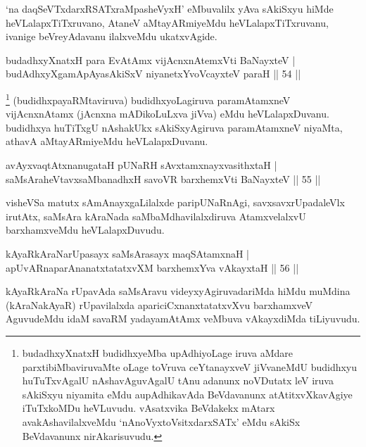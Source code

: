 \begin{artha}
`na daqSeVTxdarxRSATxraMpasheVyxH' eMbuvalilx yAva sAkiSxyu hiMde heVLalapxTiTxruvano, AtaneV aMtayARmiyeMdu heVLalapxTiTxruvanu, ivanige beVreyAdavanu ilalxveMdu ukatxvAgide.
\end{artha}


\begin{shl}
budadhxyXnatxH para EvA\s \s tAmx vijAcnxnAtemxVti BaNayxteV |\\
budAdhxyXgamApAyasAkiSxV niyanetxYvoVcayxteV paraH \hfill || 54 ||
\end{shl}

\begin{artha}
\footnote{budadhxyXnatxH budidhxyeMba upAdhiyoLage iruva aMdare parxtibiMbaviruvaMte oLage toVruva ceYtanayxveV jiVvaneMdU budidhxyu huTuTxvAgalU nAshavAguvAgalU tAnu adanunx noVDutatx leV iruva sAkiSxyu niyamita eMdu aupAdhikavAda BeVdavanunx atAtitxvXkavAgiye iTuTxkoMDu heVLuvudu. vAsatxvika BeVdakekx mAtarx avakAshavilalxveMdu `nAnoVyxtoV\s sitxdarxSATx' eMdu sAkiSx BeVdavanunx nirAkarisuvudu.} (budidhxpayaRMtaviruva) budidhxyoLagiruva paramAtamxneV vijAcnxnAtamx (jAcnxna mADikoLuLxva jiVva) eMdu heVLalapxDuvanu. budidhxya huTiTxgU nAshakUkx sAkiSxyAgiruva paramAtamxneV niyaMta, athavA aMtayARmiyeMdu heVLalapxDuvanu.
\end{artha}


\begin{shl}
avAyxvaqtAtxnanugataH pUNaRH sAvxtamxnayxvasithxtaH |\\
saMsAraheVtavxsaMbanadhxH savoVR barxhemxVti BaNayxteV \hfill || 55 ||
\end{shl}

\begin{artha}
visheVSa matutx sAmAnayxgaLilalxde paripUNaRnAgi, savxsavxrUpadaleVlx irutAtx, saMsAra kAraNada saMbaMdhavilalxdiruva AtamxvelalxvU barxhamxveMdu heVLalapxDuvudu.
\end{artha}

\begin{shl}
kAyaRkAraNarUpasayx saMsArasayx maqSAtamxnaH |\\
apUvARnaparAnanatxtatatxvXM barxhemxYva vAkayxtaH \hfill || 56 ||
\end{shl}

\begin{artha}%
kAyaRkAraNa rUpavAda saMsAravu videyxyAgiruvadariMda hiMdu muMdina (kAraNakAyaR) rUpavilalxda apariciCxnanxtatatxvXvu barxhamxveV AguvudeMdu idaM savaRM yadayamAtAmx veMbuva vAkayxdiMda tiLiyuvudu.
\end{artha}

